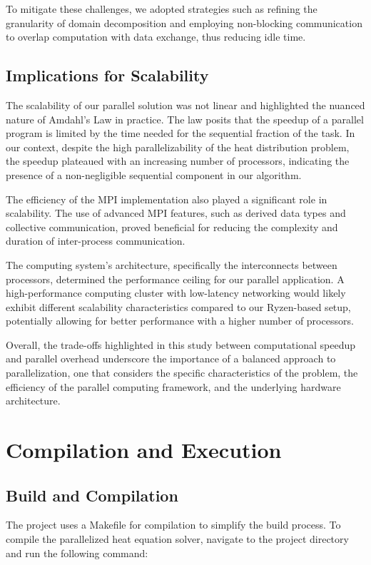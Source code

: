 \documentclass[11pt]{article}
\begin{document}
    To mitigate these challenges, we adopted strategies such as refining the granularity of domain decomposition and employing non-blocking communication to overlap computation with data exchange, thus reducing idle time.

    \subsection{Implications for Scalability}
    The scalability of our parallel solution was not linear and highlighted the nuanced nature of Amdahl's Law in practice. The law posits that the speedup of a parallel program is limited by the time needed for the sequential fraction of the task. In our context, despite the high parallelizability of the heat distribution problem, the speedup plateaued with an increasing number of processors, indicating the presence of a non-negligible sequential component in our algorithm.

    The efficiency of the MPI implementation also played a significant role in scalability. The use of advanced MPI features, such as derived data types and collective communication, proved beneficial for reducing the complexity and duration of inter-process communication.

    The computing system's architecture, specifically the interconnects between processors, determined the performance ceiling for our parallel application. A high-performance computing cluster with low-latency networking would likely exhibit different scalability characteristics compared to our Ryzen-based setup, potentially allowing for better performance with a higher number of processors.

    Overall, the trade-offs highlighted in this study between computational speedup and parallel overhead underscore the importance of a balanced approach to parallelization, one that considers the specific characteristics of the problem, the efficiency of the parallel computing framework, and the underlying hardware architecture.

    \section{Compilation and Execution}
        \subsection{Build and Compilation}
        The project uses a Makefile for compilation to simplify the build process. To compile the parallelized heat equation solver, navigate to the project directory and run the following command:
        
\end{document}
